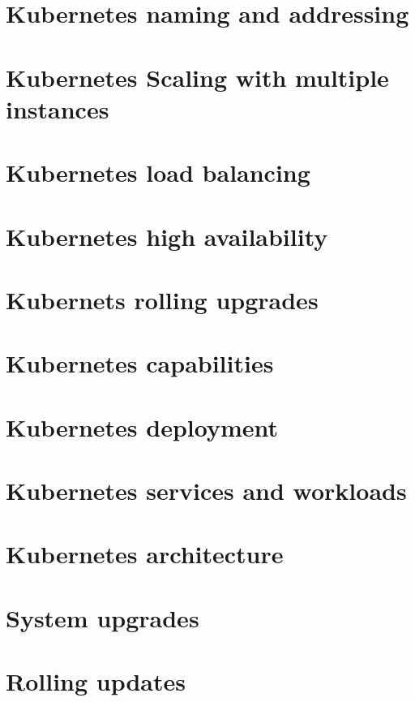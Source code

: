 \documentclass[11pt]{article}
\begin{document}
\section{Kubernetes naming and addressing}

\section{Kubernetes Scaling with multiple instances}

\section{Kubernetes load balancing}

\section{Kubernetes high availability}

\section{Kubernets rolling upgrades}

\section{Kubernetes capabilities}

\section{Kubernetes deployment}

\section{Kubernetes services and workloads}

\section{Kubernetes architecture}

\section{System upgrades}

\section{Rolling updates}
\end{document}
